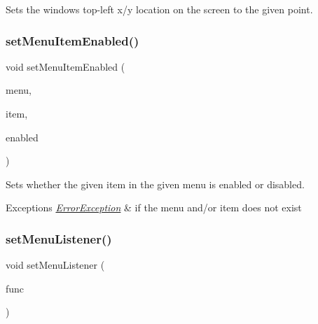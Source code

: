 Sets the window\textquotesingle{}s top-\/left x/y location on the screen to the given point. 

\mbox{\label{classGWindow_a875124740630bebec069479fd3958efc}} 
\subsubsection{\texorpdfstring{set\+Menu\+Item\+Enabled()}{setMenuItemEnabled()}}
{\footnotesize\ttfamily void set\+Menu\+Item\+Enabled (\begin{DoxyParamCaption}\item[{const std\+::string \&}]{menu,  }\item[{const std\+::string \&}]{item,  }\item[{bool}]{enabled }\end{DoxyParamCaption})\hspace{0.3cm}{\ttfamily [virtual]}}



Sets whether the given item in the given menu is enabled or disabled. 


\begin{DoxyExceptions}{Exceptions}
{\em \mbox{\hyperlink{classErrorException}{Error\+Exception}}} & if the menu and/or item does not exist \\
\hline
\end{DoxyExceptions}
\mbox{\label{classGWindow_ab0002e0bf6566a5b98cc9128cb859b0e}} 
\subsubsection{\texorpdfstring{set\+Menu\+Listener()}{setMenuListener()}\hspace{0.1cm}{\footnotesize\ttfamily [1/2]}}
{\footnotesize\ttfamily void set\+Menu\+Listener (\begin{DoxyParamCaption}\item[{G\+Event\+Listener}]{func }\end{DoxyParamCaption})\hspace{0.3cm}{\ttfamily [virtual]}}




